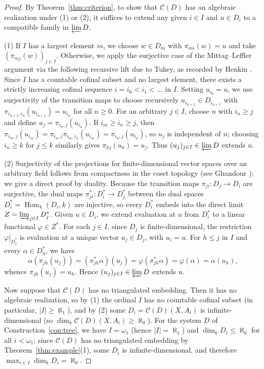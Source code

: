 \documentclass[a4paper,reqno,10pt]{amsart}
\numberwithin{equation}{section}
\theoremstyle{definition}
\newcommand{\C}{\mathcal C}
\DeclareMathOperator{\Hom}{Hom}
\begin{document}
\begin{proof}
By Theorem~\ref{thm:criterion}, to show that $\C(D)$ has an algebraic
realization under (1) or (2), it suffices to extend any given $i\in I$ and
$u\in D_i$ to a compatible family in $\varprojlim D$.

(1) If $I$ has a largest element $m$, we choose $w\in D_m$ with $\pi_{mi}(w)=u$
and take $(\pi_{mj}(w))_{j\in I}$. Otherwise, we apply the surjective case of
the Mittag--Leffler argument via the following recursive lift due to Tukey, as
recorded by Henkin \cite[p.~224]{Hen}. Since $I$ has a countable cofinal subset
and no largest element, there exists a strictly increasing cofinal sequence
$i=i_0<i_1<\dots$ in $I$. Setting $u_{i_0}=u$, we use surjectivity of the
transition maps to choose recursively $u_{i_{n+1}}\in D_{i_{n+1}}$ with
$\pi_{i_{n+1},i_n}(u_{i_{n+1}})=u_{i_n}$ for all $n\ge 0$. For an arbitrary
$j\in I$, choose $n$ with $i_n\ge j$ and define $u_j=\pi_{i_n,j}(u_{i_n})$. If
$i_m\ge i_n\ge j$, then
$\pi_{i_m,j}(u_{i_m})=\pi_{i_n,j}\pi_{i_m,i_n}(u_{i_m})=\pi_{i_n,j}(u_{i_n})$,
so $u_j$ is independent of $n$; choosing $i_n\ge k$ for $j\le k$ similarly
gives $\pi_{kj}(u_k)=u_j$. Thus $(u_j)_{j\in I}\in\varprojlim D$ extends $u$.

(2) Surjectivity of the projections for finite-dimensional vector spaces over
an arbitrary field follows from compactness in the coset topology (see Ghandour
\cite[Example~2.19 and Theorem~2.21(2)]{Gh}); we give a direct proof by
duality. Because the transition maps $\pi_{ji}:D_j\to D_i$ are surjective, the
dual maps $\pi_{ji}^*:D_i^*\to D_j^*$ between the dual spaces
$D_i^*=\Hom_k(D_i,k)$ are injective, so every $D_i^*$ embeds into the direct
limit $Z=\varinjlim_{j\in I} D_j^*$. Given $u\in D_i$, we extend evaluation at
$u$ from $D_i^*$ to a linear functional $\varphi\in Z^*$. For each $j\in I$,
since $D_j$ is finite-dimensional, the restriction $\varphi|_{D_j^*}$ is
evaluation at a unique vector $u_j\in D_j$, with $u_i=u$. For $h\le j$ in $I$
and every $\alpha\in D_h^*$, we have
\[
  \alpha(\pi_{jh}(u_j))=(\pi_{jh}^*\alpha)(u_j)
  =\varphi(\pi_{jh}^*\alpha)=\varphi(\alpha)=\alpha(u_h),
\]
whence $\pi_{jh}(u_j)=u_h$. Hence $(u_j)_{j\in I}\in\varprojlim D$ extends $u$.

Now suppose that $\C(D)$ has no triangulated embedding. Then it has no
algebraic realization, so by (1) the ordinal $I$ has no countable cofinal
subset (in particular, $|I|\ge\aleph_1$), and by (2) some
$D_i=\C(D)(X,A_i)$ is infinite-dimensional (so $\dim_k\C(D)(X,A_i)\ge\aleph_0$).
For the system $D$ of Construction~\ref{con:tree}, we have $I=\omega_1$ (hence
$|I|=\aleph_1$) and $\dim_k D_i\le\aleph_0$ for all $i<\omega_1$; since
$\C(D)$ has no triangulated embedding by Theorem~\ref{thm:example}(1), some
$D_i$ is infinite-dimensional, and therefore $\max_{i\in I}\dim_k D_i=\aleph_0$.
\end{proof}
\end{document}
